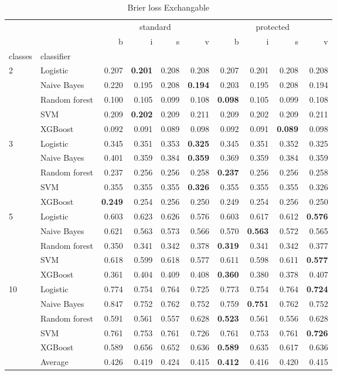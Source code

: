 \begin{table}
\caption{Brier loss Exchangable}
\begin{tabular}{l|l|rrrr|rrrr}
\toprule
 &  & \multicolumn{4}{c}{standard} & \multicolumn{4}{c}{protected} \\
 &  & b & i & s & v & b & i & s & v \\
classes & classifier &  &  &  &  &  &  &  &  \\
\midrule
\midrule
\multirow[c]{5}{*}{2} & Logistic & 0.207 & \textbf{0.201} & 0.208 & 0.208 & 0.207 & 0.201 & 0.208 & 0.208 \\
 & Naive Bayes & 0.220 & 0.195 & 0.208 & \textbf{0.194} & 0.203 & 0.195 & 0.208 & 0.194 \\
 & Random forest & 0.100 & 0.105 & 0.099 & 0.108 & \textbf{0.098} & 0.105 & 0.099 & 0.108 \\
 & SVM & 0.209 & \textbf{0.202} & 0.209 & 0.211 & 0.209 & 0.202 & 0.209 & 0.211 \\
 & XGBoost & 0.092 & 0.091 & 0.089 & 0.098 & 0.092 & 0.091 & \textbf{0.089} & 0.098 \\
\midrule
\multirow[c]{5}{*}{3} & Logistic & 0.345 & 0.351 & 0.353 & \textbf{0.325} & 0.345 & 0.351 & 0.352 & 0.325 \\
 & Naive Bayes & 0.401 & 0.359 & 0.384 & \textbf{0.359} & 0.369 & 0.359 & 0.384 & 0.359 \\
 & Random forest & 0.237 & 0.256 & 0.256 & 0.258 & \textbf{0.237} & 0.256 & 0.256 & 0.258 \\
 & SVM & 0.355 & 0.355 & 0.355 & \textbf{0.326} & 0.355 & 0.355 & 0.355 & 0.326 \\
 & XGBoost & \textbf{0.249} & 0.254 & 0.256 & 0.250 & 0.249 & 0.254 & 0.256 & 0.250 \\
\midrule
\multirow[c]{5}{*}{5} & Logistic & 0.603 & 0.623 & 0.626 & 0.576 & 0.603 & 0.617 & 0.612 & \textbf{0.576} \\
 & Naive Bayes & 0.621 & 0.563 & 0.573 & 0.566 & 0.570 & \textbf{0.563} & 0.572 & 0.565 \\
 & Random forest & 0.350 & 0.341 & 0.342 & 0.378 & \textbf{0.319} & 0.341 & 0.342 & 0.377 \\
 & SVM & 0.618 & 0.599 & 0.618 & 0.577 & 0.611 & 0.598 & 0.611 & \textbf{0.577} \\
 & XGBoost & 0.361 & 0.404 & 0.409 & 0.408 & \textbf{0.360} & 0.380 & 0.378 & 0.407 \\
\midrule
\multirow[c]{5}{*}{10} & Logistic & 0.774 & 0.754 & 0.764 & 0.725 & 0.773 & 0.754 & 0.764 & \textbf{0.724} \\
 & Naive Bayes & 0.847 & 0.752 & 0.762 & 0.752 & 0.759 & \textbf{0.751} & 0.762 & 0.752 \\
 & Random forest & 0.591 & 0.561 & 0.557 & 0.628 & \textbf{0.523} & 0.561 & 0.556 & 0.628 \\
 & SVM & 0.761 & 0.753 & 0.761 & 0.726 & 0.761 & 0.753 & 0.761 & \textbf{0.726} \\
 & XGBoost & 0.589 & 0.656 & 0.652 & 0.636 & \textbf{0.589} & 0.635 & 0.617 & 0.636 \\\midrule\ & Average & 0.426 & 0.419 & 0.424 & 0.415 & \textbf{0.412} & 0.416 & 0.420 & 0.415 \\
\bottomrule
\end{tabular}
\end{table}
